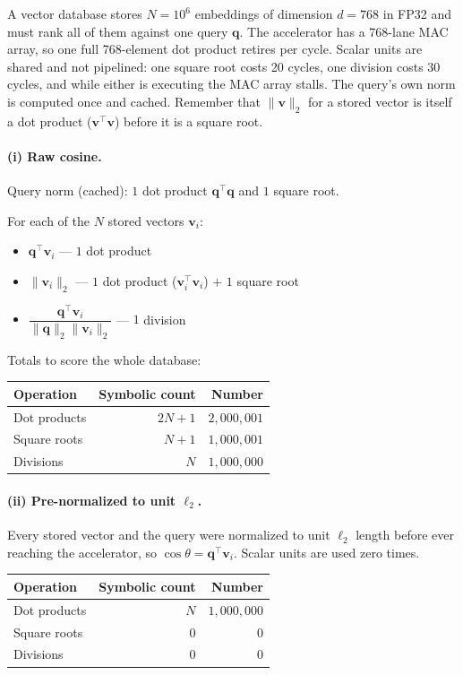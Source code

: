 \documentclass[11pt]{article}
\newcommand{\vct}[1]{\mathbf{#1}}
\begin{document}
A vector database stores \(N = 10^6\) embeddings of dimension \(d = 768\) in
FP32 and must rank all of them against one query \(\vct{q}\). The accelerator
has a 768-lane MAC array, so one full 768-element dot product retires per
cycle. Scalar units are shared and not pipelined: one square root costs 20
cycles, one division costs 30 cycles, and while either is executing the MAC
array stalls. The query's own norm is computed once and cached. Remember
that \(\|\vct{v}\|_2\) for a stored vector is itself a dot product
(\(\vct{v}^\top \vct{v}\)) before it is a square root.

\paragraph{(i) Raw cosine.}
Query norm (cached): \(1\) dot product \(\vct{q}^\top \vct{q}\) and
\(1\) square root.

For each of the \(N\) stored vectors \(\vct{v}_i\):
\begin{itemize}[leftmargin=1.4em]
    \item \(\vct{q}^\top \vct{v}_i\) --- \(1\) dot product
    \item \(\|\vct{v}_i\|_2\) --- \(1\) dot product
         (\(\vct{v}_i^\top \vct{v}_i\)) \(+\) \(1\) square root
    \item \(\dfrac{\vct{q}^\top \vct{v}_i}{\|\vct{q}\|_2 \|\vct{v}_i\|_2}\)
         --- \(1\) division
\end{itemize}
Totals to score the whole database:
\begin{center}
\begin{tabular}{lrr}
    \toprule
    Operation & Symbolic count & Number \\
    \midrule
    Dot products & \(2N + 1\) & \(2{,}000{,}001\) \\
    Square roots & \(N + 1\)  & \(1{,}000{,}001\) \\
    Divisions    & \(N\)      & \(1{,}000{,}000\) \\
    \bottomrule
\end{tabular}
\end{center}

\paragraph{(ii) Pre-normalized to unit \(\ell_2\).}
Every stored vector and the query were normalized to unit \(\ell_2\) length
before ever reaching the accelerator, so
\(\cos\theta = \vct{q}^\top \vct{v}_i\). Scalar units are used zero times.
\begin{center}
\begin{tabular}{lrr}
    \toprule
    Operation & Symbolic count & Number \\
    \midrule
    Dot products & \(N\) & \(1{,}000{,}000\) \\
    Square roots & \(0\) & \(0\) \\
    Divisions    & \(0\) & \(0\) \\
    \bottomrule
\end{tabular}
\end{center}
\end{document}
